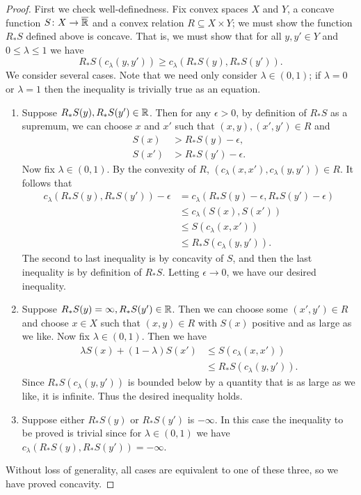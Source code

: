 \documentclass[12pt, reqno]{amsart}
\newcommand{\extreal}{\overline{\real}}
\begin{document}
\begin{proof}
    First we check well-definedness. Fix convex spaces $X$ and $Y$, a concave function $S \maps X \to \extreal$ and a convex relation $R \subseteq X \times Y$; we must show the function $R_*S$ defined above is concave. That is, we must show that for all $y, y' \in Y$ and $0 \le \lambda \le 1$ we have
    \[ R_*S(c_\lambda(y, y')) \geq c_\lambda(R_*S(y), R_*S(y')) .\]
    We consider several cases. Note that we need only consider $\lambda \in (0, 1)$; if $\lambda = 0$ or $\lambda = 1$ then the inequality is trivially true as an equation.
    \begin{enumerate}
        \item Suppose $R_*S(y), R_*S(y') \in \mathbb{R}$. Then for any $\epsilon > 0$, by definition of $R_*S$ as a supremum, we can choose $x$ and $x'$ such that $(x, y), (x', y') \in R$ and
        \begin{align*}
            S(x) &> R_*S(y) - \epsilon, \\
            S(x') &> R_*S(y') - \epsilon.
        \end{align*}
        Now fix $\lambda \in (0, 1)$. By the convexity of $R$, $(c_\lambda(x, x'), c_\lambda(y, y')) \in R$. It follows that
        \begin{align*}
            c_\lambda(R_*S(y), R_*S(y')) - \epsilon
            &= c_\lambda(R_*S(y)-\epsilon, R_*S(y') - \epsilon)
            \\&\leq c_\lambda(S(x), S(x'))
            \\&\leq S(c_\lambda(x, x'))
            \\&\leq R_*S(c_\lambda(y, y')).
        \end{align*}
        The second to last inequality is by concavity of $S$, and then the last inequality is by definition of $R_* S$. Letting $\epsilon \to 0$, we have our desired inequality.
        \item Suppose $R_*S(y) = \infty, R_*S(y') \in \mathbb{R}$. Then we can choose some $(x', y') \in R$ and choose $x \in X$ such that $(x,y) \in R$ with $S(x)$ positive and as large as we like. Now fix $\lambda \in (0, 1)$. Then we have
        \begin{align*}
            \lambda S(x) + (1-\lambda) S(x')
            &\leq S(c_\lambda(x,x'))
            \\&\leq R_*S(c_\lambda(y,y')).
        \end{align*}
        Since $R_*S(c_\lambda(y,y'))$ is bounded below by a quantity that is as large as we like, it is infinite. Thus the desired inequality holds.
        \item Suppose either $R_\ast S(y)$ or $R_\ast S(y')$ is $-\infty$. In this case the inequality to be proved is trivial since for $\lambda \in (0,1)$ we have $c_\lambda(R_\ast S(y),R_\ast S(y')) = -\infty$.
    \end{enumerate}
    Without loss of generality, all cases are equivalent to one of these three, so we have proved concavity.
    

\end{proof}
\end{document}
